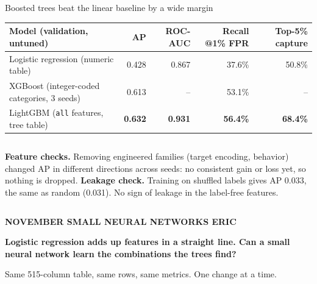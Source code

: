 \documentclass[aspectratio=169,10pt]{beamer}
\begin{document}
\begin{frame}{Boosted trees beat the linear baseline by a wide margin}
\vspace{0.1cm}
\renewcommand{\arraystretch}{1.25}\small
\begin{tabularx}{\linewidth}{@{}L rrrr@{}}
\toprule
\textbf{Model (validation, untuned)} & \textbf{AP} & \textbf{ROC-AUC} & \textbf{Recall @1\% FPR} & \textbf{Top-5\% capture}\\
\midrule
Logistic regression (numeric table) & 0.428 & 0.867 & 37.6\% & 50.8\% \\
XGBoost (integer-coded categories, 3 seeds) & 0.613 & -- & 53.1\% & -- \\
 LightGBM (\texttt{all} features, tree table) & \textbf{0.632} & \textbf{0.931} & \textbf{56.4\%} & \textbf{68.4\%} \\
\bottomrule
\end{tabularx}
\vspace{0.35cm}
\begin{columns}[T]
\small
\textbf{\color{ink}Feature checks.} Removing engineered families (target encoding, behavior) changed AP in different directions across seeds: no consistent gain or loss yet, so nothing is dropped.
\small
\textbf{\color{ink}Leakage check.} Training on shuffled labels gives AP 0.033, the same as random (0.031). No sign of leakage in the label-free features.
\end{columns}
\vspace{0.15cm}
\end{frame}

{
\begin{frame}[plain]
\vspace*{1.6cm}
{\color{mint}\small\bfseries NOVEMBER \textperiodcentered{} SMALL NEURAL NETWORKS \textperiodcentered{} ERIC}\\[0.4cm]
{\color{paper}\fontsize{26}{31}\selectfont\bfseries Logistic regression adds up features in a straight line. Can a small neural network learn the combinations the trees find?\par}
\vspace{0.6cm}
{\color{paper}\normalsize Same 515-column table, same rows, same metrics. One change at a time.}
\end{frame}}
\end{document}
